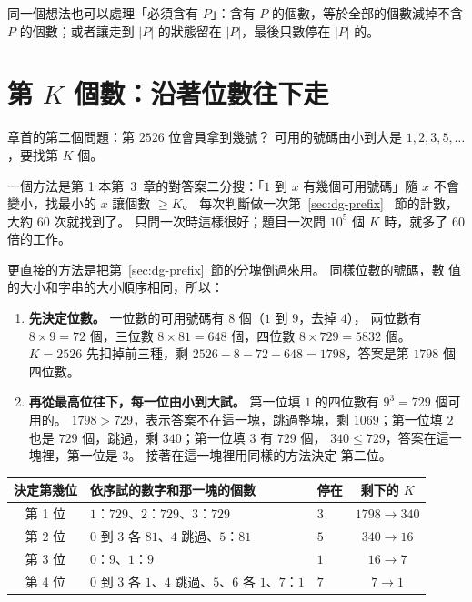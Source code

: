 同一個想法也可以處理「必須含有 $P$」：含有 $P$ 的個數，等於全部的個數減掉不含
$P$ 的個數；或者讓走到 $|P|$ 的狀態留在 $|P|$，最後只數停在 $|P|$ 的。

\section{第 \texorpdfstring{$K$}{K} 個數：沿著位數往下走}
\label{sec:dg-kth}

章首的第二個問題：第 $2526$ 位會員拿到幾號？ 可用的號碼由小到大是
$1, 2, 3, 5, \ldots$，要找第 $K$ 個。

一個方法是第 1 本第~3~章的對答案二分搜：「$1$ 到 $x$ 有幾個可用號碼」隨 $x$
不會變小，找最小的 $x$ 讓個數 $\ge K$。 每次判斷做一次第~\ref{sec:dg-prefix}~
節的計數，大約 $60$ 次就找到了。 只問一次時這樣很好；題目一次問 $10^5$ 個 $K$
時，就多了 $60$ 倍的工作。

更直接的方法是把第~\ref{sec:dg-prefix}~節的分塊倒過來用。 同樣位數的號碼，數
值的大小和字串的大小順序相同，所以：

\begin{enumerate}
\item \textbf{先決定位數。} 一位數的可用號碼有 $8$ 個（$1$ 到 $9$，去掉 $4$），
兩位數有 $8 \times 9 = 72$ 個，三位數 $8 \times 81 = 648$ 個，四位數
$8 \times 729 = 5832$ 個。 $K = 2526$ 先扣掉前三種，剩
$2526 - 8 - 72 - 648 = 1798$，答案是第 $1798$ 個四位數。
\item \textbf{再從最高位往下，每一位由小到大試。} 第一位填 $1$ 的四位數有
$9^3 = 729$ 個可用的。 $1798 > 729$，表示答案不在這一塊，跳過整塊，剩
$1069$；第一位填 $2$ 也是 $729$ 個，跳過，剩 $340$；第一位填 $3$ 有 $729$ 個，
$340 \le 729$，答案在這一塊裡，第一位是 $3$。 接著在這一塊裡用同樣的方法決定
第二位。
\end{enumerate}

\begin{center}
\begin{tabular}{cllc}
\toprule
決定第幾位 & 依序試的數字和那一塊的個數 & 停在 & 剩下的 $K$ \\
\midrule
第 1 位 & $1$：$729$、$2$：$729$、$3$：$729$ & $3$ & $1798 \to 340$ \\
第 2 位 & $0$ 到 $3$ 各 $81$、$4$ 跳過、$5$：$81$ & $5$ & $340 \to 16$ \\
第 3 位 & $0$：$9$、$1$：$9$ & $1$ & $16 \to 7$ \\
第 4 位 & $0$ 到 $3$ 各 $1$、$4$ 跳過、$5$、$6$ 各 $1$、$7$：$1$ & $7$ & $7 \to 1$ \\
\bottomrule
\end{tabular}
\end{center}

